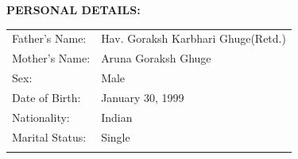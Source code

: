 \documentclass[a4paper, 10pt]{article}
\begin{document}
{\textbf{\Large{PERSONAL DETAILS:}}}\\

\begin{tabular}{ p{3cm} p{7cm} }
Father's Name: & Hav$.$ Goraksh Karbhari Ghuge(Retd.) \\ 
Mother's Name: & Aruna Goraksh Ghuge\\      
Sex: & Male \\      
Date of Birth: & January 30, 1999\\ 
Nationality: & Indian \\
Marital Status: & Single \\ 
\\
\end{tabular}
\end{document}
